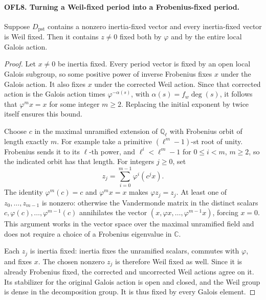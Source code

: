 \documentclass[11pt,a4paper]{article}
\numberwithin{equation}{section}
\theoremstyle{remark}\newtheorem{remark}[theorem]{Remark}
\begin{document}
\paragraph{OFL8. Turning a Weil-fixed period into a Frobenius-fixed period.}
\label{claim:OFL8}
Suppose \(D_{\mathrm{pst}}\) contains a nonzero inertia-fixed
vector and every inertia-fixed vector is Weil fixed.  Then it
contains \(z\ne0\) fixed both by \(\varphi\) and by the
entire local Galois action.
\begin{proof}
Let \(x\ne0\) be inertia fixed.  Every period vector is fixed
by an open local Galois subgroup, so some positive power of inverse
Frobenius fixes \(x\) under the Galois action.  It also fixes
\(x\) under the corrected Weil action.  Since that corrected
action is the Galois action times
\(\varphi^{-\alpha(s)}\), with
\(\alpha(s)=f_w\deg(s)\), it follows that
\(\varphi^m x=x\) for some integer \(m\ge2\).
Replacing the initial exponent by twice itself ensures this bound.

Choose \(c\) in the maximal unramified extension of
\(\mathbb Q_\ell\) with Frobenius orbit of length exactly
\(m\).  For example take a primitive
\((\ell^m-1)\)-st root of unity.  Frobenius sends it to
its \(\ell\)-th power, and
\(\ell^i<\ell^m-1\) for \(0\le i<m\), \(m\ge2\),
so the indicated orbit has that length.  For integers \(j\ge0\),
set
\[
                  z_j=\sum_{i=0}^{m-1}\varphi^i(c^j x).
 \tag{OFL.9}
\]
The identity \(\varphi^m(c)=c\) and
\(\varphi^m x=x\) makes \(\varphi z_j=z_j\).
At least one of \(z_0,\ldots,z_{m-1}\) is nonzero: otherwise
the Vandermonde matrix in the distinct scalars
\(c,\varphi(c),\ldots,\varphi^{m-1}(c)\) annihilates the
vector \((x,\varphi x,\ldots,\varphi^{m-1}x)\), forcing
\(x=0\).  This argument works in the vector space over the
maximal unramified field and does not require a choice of a
Frobenius eigenvalue in \(\mathbb C\).

Each \(z_j\) is inertia fixed: inertia fixes the unramified
scalars, commutes with \(\varphi\), and fixes \(x\).
The chosen nonzero \(z_j\) is therefore Weil fixed as well.
Since it is already Frobenius fixed, the corrected and uncorrected
Weil actions agree on it.  Its stabilizer for the original Galois
action is open and closed, and the Weil group is dense in the
decomposition group.  It is thus fixed by every Galois element.
\end{proof}

\end{document}
